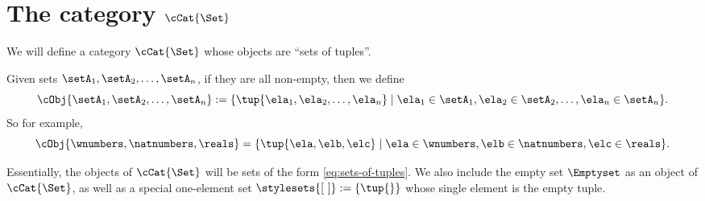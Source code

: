 
\section{The category $\cCat{\Set}$}

We will define a category $\cCat{\Set}$ whose objects are ``sets of tuples''.


%
%
%

Given sets $\setA_1, \setA_2, \dots , \setA_n$, if they are all non-empty, then we define
\begin{equation}\label{eq:sets-of-tuples}
   \cObj{\setA_1, \setA_2, \dots, \setA_n} := \{ \tup{\ela_1, \ela_2, \dots, \ela_n} \mid \ela_1 \in \setA_1, \ela_2 \in \setA_2, \dots, \ela_n \in \setA_n \}.
\end{equation}
So for example,
\begin{equation}
    \cObj{\wnumbers, \natnumbers, \reals} = \{ \tup{\ela, \elb, \elc} \mid \ela \in \wnumbers, \elb \in \natnumbers, \elc \in \reals \}.
\end{equation}



Essentially, the objects of $\cCat{\Set}$ will be sets of the form \cref{eq:sets-of-tuples}. We also include the empty set $\Emptyset$ as an object of $\cCat{\Set}$, as well as a special one-element set $\stylesets{[ \ ]} := \{ \tup{} \}$ whose single element is the empty tuple.

